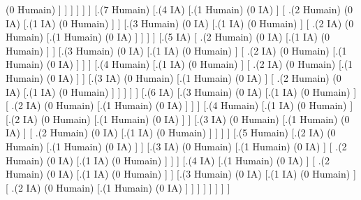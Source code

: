 \documentclass{article}
\begin{document}
\begin{inctext}
                            {(0 Humain)} ] ]   ] ]  ]  ] 
[.{(7 Humain)} 
    [.{(4 IA)}  
    [.{(1 Humain)} 
    {(0 IA)} ] 
        [ .{(2  Humain)} 
                {(0 IA)} 
                [.{(1 IA)} 
                    {(0 Humain)} ] ]  
        [.{(3 Humain)} 
            {(0 IA)} 
            [.{(1 IA)} 
                {(0 Humain)} ] 
            [ .{(2  IA)} 
                {(0 Humain)} 
                [.{(1 Humain)} 
                    {(0 IA)} ] ]  ] ]  
    [.{(5 IA)}  
        [ .{(2  Humain)} 
            {(0 IA)} 
            [.{(1 IA)} 
                {(0 Humain)} ] ]
        [.{(3 Humain)} 
            {(0 IA)} 
            [.{(1 IA)} 
                {(0 Humain)} ] 
            [ .{(2  IA)} 
                {(0 Humain)} 
                [.{(1 Humain)} 
                    {(0 IA)} ] ]  ] 
        [.{(4 Humain)}  
            [.{(1 IA)} 
                {(0 Humain)} ]  
            [ .{(2  IA)} 
                {(0 Humain)} 
                [.{(1 Humain)} 
                    {(0 IA)} ] ]
            [.{(3 IA)} {(0 Humain)} [.{(1 Humain)} {(0 IA)} ] [ .{(2  Humain)} {(0 IA)} [.{(1 IA)} {(0 Humain)} ] ]   ] ]  ]  
    [.{(6 IA)} 
        [.{(3 Humain)} 
            {(0 IA)} 
            [.{(1 IA)} 
                {(0 Humain)} ] 
            [ .{(2  IA)} 
                {(0 Humain)} 
                [.{(1 Humain)} 
                    {(0 IA)} ] ]  ] 
        [.{(4 Humain)}  
            [.{(1 IA)} 
                {(0 Humain)} ] 
            [.{(2  IA)} 
                {(0 Humain)} 
                [.{(1 Humain)} 
                        {(0 IA)} ] ]  
            [.{(3 IA)} 
                {(0 Humain)} 
                [.{(1 Humain)} 
                    {(0 IA)} ] 
                [ .{(2  Humain)} 
                    {(0 IA)} 
                    [.{(1 IA)} 
                        {(0 Humain)} ] ]   ] ] 
        [.{(5 Humain)}  
            [.{(2  IA)} 
                {(0 Humain)} 
                [.{(1 Humain)} 
                        {(0 IA)} ] ] 
            [.{(3 IA)} 
                {(0 Humain)} 
                [.{(1 Humain)} 
                    {(0 IA)} ] 
                    [ .{(2  Humain)} 
                        {(0 IA)} 
                        [.{(1 IA)} 
                            {(0 Humain)} ] ]   ] 
            [.{(4 IA)}  
            [.{(1 Humain)} 
            {(0 IA)} ]
                [ .{(2  Humain)} 
                    {(0 IA)} 
                    [.{(1 IA)} 
                        {(0 Humain)} ] ]
                [.{(3 Humain)} 
                    {(0 IA)} 
                    [.{(1 IA)} 
                        {(0 Humain)} ] 
                    [ .{(2  IA)} 
                        {(0 Humain)} 
                        [.{(1 Humain)} 
                            {(0 IA)} ] ]  ] ]  ]  ]  ]  ]


\end{inctext}
\end{document}
